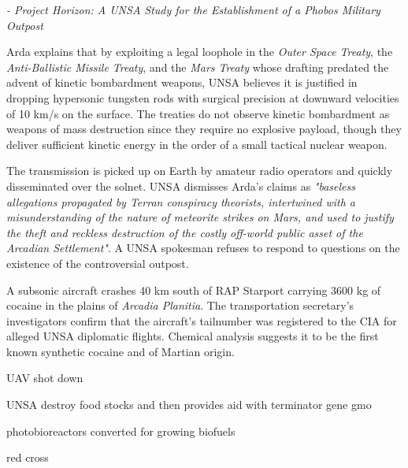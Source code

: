 \hskip 1.5cm {\it - Project Horizon: A UNSA Study for the Establishment of a Phobos Military Outpost}
\stopTimelineGeneralDocument

Arda explains that by exploiting a legal loophole in the {\it Outer Space Treaty}, the {\it Anti-Ballistic Missile Treaty}, and the {\it Mars Treaty} whose drafting predated the advent of kinetic bombardment weapons, UNSA believes it is justified in dropping hypersonic tungsten rods with surgical precision at downward velocities of 10 km/s on the surface. The treaties do not observe kinetic bombardment as weapons of mass destruction since they require no explosive payload, though they deliver sufficient kinetic energy in the order of a small tactical nuclear weapon.

The transmission is picked up on Earth by amateur radio operators and quickly disseminated over the solnet. UNSA dismisses Arda's claims as {\it "baseless allegations propagated by Terran conspiracy theorists, intertwined with a misunderstanding of the nature of meteorite strikes on Mars, and used to justify the theft and reckless destruction of the costly off-world public asset of the Arcadian Settlement"}. A UNSA spokesman refuses to respond to questions on the existence of the controversial outpost.
\StopTimelineDate

A subsonic aircraft crashes 40 km south of RAP Starport carrying 3600 kg of cocaine in the plains of {\it Arcadia Planitia}. The transportation secretary's investigators confirm that the aircraft's tailnumber was registered to the CIA for alleged UNSA diplomatic flights. Chemical analysis suggests it to be the first known synthetic cocaine and of Martian origin.
\StopTimelineDate

UAV shot down

UNSA destroy food stocks and then provides aid with terminator gene gmo

photobioreactors converted for growing biofuels

red cross

